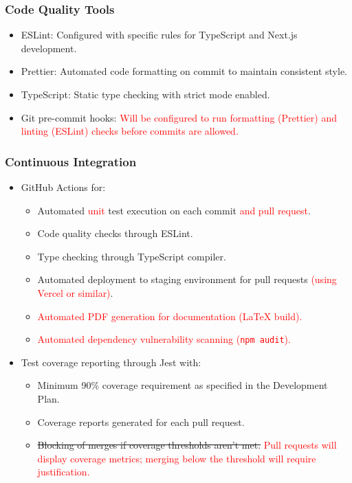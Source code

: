 \documentclass[12pt, titlepage]{article}
\begin{document}
\subsubsection*{Code Quality Tools} \label{sec:CodingStandard}
\begin{itemize}
    \item ESLint: Configured with specific rules for TypeScript and Next.js development.
    \item Prettier: Automated code formatting on commit to maintain consistent style.
    \item TypeScript: Static type checking with strict mode enabled.
    \item Git pre-commit hooks: \textcolor{red}{Will be configured to run formatting (Prettier) and linting (ESLint) checks before commits are allowed.}
\end{itemize}

\subsubsection*{Continuous Integration}
\begin{itemize}
    \item GitHub Actions for:
    \begin{itemize}
        \item Automated \textcolor{red}{unit} test execution on each commit \textcolor{red}{and pull request}.
        \item Code quality checks through ESLint.
        \item Type checking through TypeScript compiler.
        \item Automated deployment to staging environment for pull requests \textcolor{red}{(using Vercel or similar)}.
        \item \textcolor{red}{Automated PDF generation for documentation (LaTeX build).}
        \item \textcolor{red}{Automated dependency vulnerability scanning (\texttt{npm audit}).}
    \end{itemize}
    \item Test coverage reporting through Jest with:
    \begin{itemize}
        \item Minimum 90\% coverage requirement as specified in the Development Plan.
        \item Coverage reports generated for each pull request.
        \item \sout{Blocking of merges if coverage thresholds aren't met.} \textcolor{red}{Pull requests will display coverage metrics; merging below the threshold will require justification.}
    \end{itemize}
\end{itemize}
\end{document}
